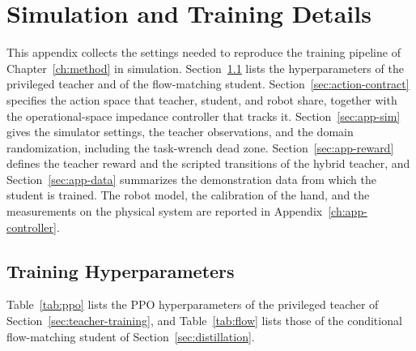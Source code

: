 \chapter{Simulation and Training Details}\label{ch:appendix}%

This appendix collects the settings needed to reproduce the training pipeline of Chapter~\ref{ch:method} in simulation. Section~\ref{sec:app-hparams} lists the hyperparameters of the privileged teacher and of the flow-matching student. Section~\ref{sec:action-contract} specifies the action space that teacher, student, and robot share, together with the operational-space impedance controller that tracks it. Section~\ref{sec:app-sim} gives the simulator settings, the teacher observations, and the domain randomization, including the task-wrench dead zone. Section~\ref{sec:app-reward} defines the teacher reward and the scripted transitions of the hybrid teacher, and Section~\ref{sec:app-data} summarizes the demonstration data from which the student is trained. The robot model, the calibration of the hand, and the measurements on the physical system are reported in Appendix~\ref{ch:app-controller}.

\section{Training Hyperparameters}\label{sec:app-hparams}

Table~\ref{tab:ppo} lists the \acs{PPO} hyperparameters of the privileged teacher of Section~\ref{sec:teacher-training}, and Table~\ref{tab:flow} lists those of the conditional flow-matching student of Section~\ref{sec:distillation}.

